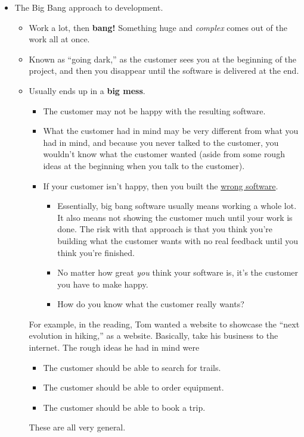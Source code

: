 \documentclass[letterpaper]{article}
\begin{document}
\begin{itemize}
    \item The Big Bang approach to development. 
    \begin{itemize}
        \item Work a lot, then \textbf{bang!} Something huge and \emph{complex} comes out of the work all at once. 
        \item Known as ``going dark,'' as the customer sees you at the beginning of the project, and then you disappear until the software is delivered at the end. 
        \item Usually ends up in a \textbf{big mess}. 
        \begin{itemize}
            \item The customer may not be happy with the resulting software. 
            \item What the customer had in mind may be very different from what you had in mind, and because you never talked to the customer, you wouldn't know what the customer wanted (aside from some rough ideas at the beginning when you talk to the customer).
            \item If your customer isn't happy, then you built the \underline{wrong software}.
            \begin{itemize}
                \item Essentially, big bang software usually means working a whole lot. It also means not showing the customer much until your work is done. The risk with that approach is that you think you're building what the customer wants with no real feedback until you think you're finished. 
                \item No matter how great \emph{you} think your software is, it's the customer you have to make happy. 
                \item How do you know what the customer really wants? 
            \end{itemize}
        \end{itemize}


        \begin{mdframed}
            For example, in the reading, Tom wanted a website to showcase the ``next evolution in hiking,'' as a website. Basically, take his business to the internet. The rough ideas he had in mind were 
            \begin{itemize}
                \item The customer should be able to search for trails. 
                \item The customer should be able to order equipment. 
                \item The customer should be able to book a trip. 
            \end{itemize}
            These are all very general. 
        \end{mdframed}
    \end{itemize}



\end{itemize}
\end{document}
